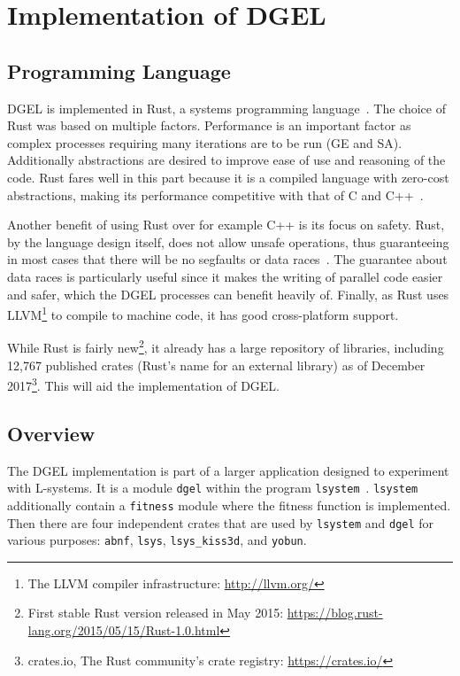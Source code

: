 \chapter{Implementation of DGEL}
\section{Programming Language}
DGEL is implemented in Rust, a systems programming language~\cite{Rust}.
The choice of Rust was based on multiple factors.
Performance is an important factor as complex processes requiring many iterations are to be run (GE and SA).
Additionally abstractions are desired to improve ease of use and reasoning of the code.
Rust fares well in this part because it is a compiled language with zero-cost abstractions, making its performance competitive with that of C and C++~\cite{RustFaq}.

Another benefit of using Rust over for example C++ is its focus on safety.
Rust, by the language design itself, does not allow unsafe operations, thus guaranteeing in most cases that there will be no segfaults or data races~\cite{RustSafe,Rust,RustRace}.
The guarantee about data races is particularly useful since it makes the writing of parallel code easier and safer, which the DGEL processes can benefit heavily of.
Finally, as Rust uses LLVM\footnote{The LLVM compiler infrastructure: \url{http://llvm.org/}} to compile to machine code, it has good cross-platform support.

While Rust is fairly new\footnote{First stable Rust version released in May 2015: \url{https://blog.rust-lang.org/2015/05/15/Rust-1.0.html}}, it already has a large repository of libraries, including 12,767 published crates (Rust's name for an external library) as of December 2017\footnote{crates.io, The Rust community’s crate registry: \url{https://crates.io/}}.
This will aid the implementation of DGEL.

\section{Overview}
The DGEL implementation is part of a larger application designed to experiment with L-systems.
It is a module \texttt{dgel} within the program \texttt{lsystem}~\cite{CodeLsystem}.
\texttt{lsystem} additionally contain a \texttt{fitness} module where the fitness function is implemented.
Then there are four independent crates that are used by \texttt{lsystem} and \texttt{dgel} for various purposes: \texttt{abnf}, \texttt{lsys}, \texttt{lsys\_kiss3d}, and \texttt{yobun}.

